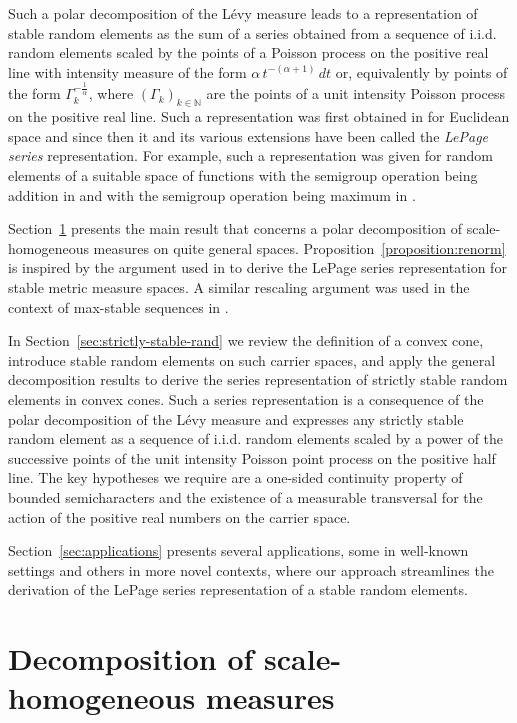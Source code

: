 \documentclass[12pt]{amsart}
\numberwithin{equation}{section}
\numberwithin{figure}{section}
\theoremstyle{plain} \newtheorem{theorem}{Theorem}[section]
\theoremstyle{plain} \newtheorem{proposition}[theorem]{Proposition}
\theoremstyle{plain} \newtheorem{lemma}[theorem]{Lemma}
\theoremstyle{plain} \newtheorem{corollary}[theorem]{Corollary}
\theoremstyle{definition} \newtheorem{definition}[theorem]{Definition}
\theoremstyle{definition} \newtheorem{notation}[theorem]{Notation}
\theoremstyle{remark} \newtheorem{remark}[theorem]{Remark}
\theoremstyle{remark} \newtheorem{example}[theorem]{Example}
\theoremstyle{definition} \newtheorem{assumption}{Assumption}
\newcommand{\bN}{\mathbb{N}}
\begin{document}
Such a polar decomposition of the L\'evy measure leads to a
representation of stable random elements as the sum of a series
obtained from a sequence of i.i.d. random elements scaled by the
points of a Poisson process on the positive real line with intensity
measure of the form $\alpha \, t^{-(\alpha + 1)} \, dt$ or,
equivalently by points of the form $\Gamma_k^{-\frac{1}{\alpha}}$,
where $(\Gamma_k)_{k \in \bN}$ are the points of a unit intensity
Poisson process on the positive real line. Such a representation was
first obtained in \cite{lep:wood:zin81} for Euclidean space and since
then it and its various extensions have been called the {\em LePage
  series} representation. For example, such a representation was given
for random elements of a suitable space of functions with the
semigroup operation being addition in \cite{sam:taq94} and with the
semigroup operation being maximum in \cite{haan84}.

Section~\ref{sec:decomp-homog-meas} presents the main result that
concerns a polar decomposition of scale-homogeneous measures on quite
general spaces. Proposition~\ref{proposition:renorm} is inspired by
the argument used in \cite[Th.~10.3]{evan:mol15} to derive the LePage
series representation for stable metric measure spaces. A similar
rescaling argument was used in the context of max-stable sequences in
\cite{haan84}.

In Section~\ref{sec:strictly-stable-rand} we review the definition of
a convex cone, introduce stable random elements on such carrier
spaces, and apply the general decomposition results to derive the
series representation of strictly stable random elements in convex
cones. Such a series representation is a consequence of the
polar decomposition of the L\'evy measure and expresses any strictly
stable random element as a sequence of i.i.d. random elements scaled
by a power of the successive points of the unit intensity Poisson
point process on the positive half line.  The key hypotheses we require are a
one-sided continuity property of bounded semicharacters and the existence of a
measurable transversal for the action of the positive real numbers on
the carrier space. 

Section~\ref{sec:applications} presents several applications, some in
well-known settings and others in more novel contexts, where our
approach streamlines the derivation of the LePage
series representation of a stable random elements.

\section{Decomposition of scale-homogeneous measures}
\label{sec:decomp-homog-meas}
\end{document}
